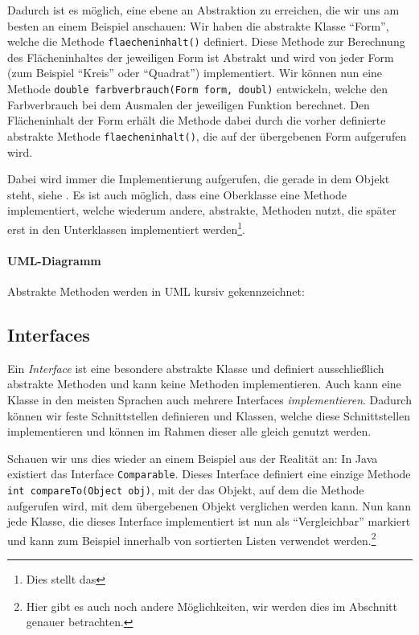 	Dadurch ist es möglich, eine ebene an Abstraktion zu erreichen, die wir uns am besten an einem Beispiel anschauen: Wir haben die abstrakte Klasse \enquote{Form}, welche die Methode \texttt{flaecheninhalt()} definiert. Diese Methode zur Berechnung des Flächeninhaltes der jeweiligen Form ist Abstrakt und wird von jeder Form (zum Beispiel \enquote{Kreis} oder \enquote{Quadrat}) implementiert. Wir können nun eine Methode \lstinline|double farbverbrauch(Form form, doubl)| entwickeln, welche den Farbverbrauch bei dem Ausmalen der jeweiligen Funktion berechnet. Den Flächeninhalt der Form erhält die Methode dabei durch die vorher definierte abstrakte Methode \texttt{flaecheninhalt()}, die auf der übergebenen Form aufgerufen wird.
	
	Dabei wird immer die Implementierung aufgerufen, die gerade in dem Objekt steht, siehe . Es ist auch möglich, dass eine Oberklasse eine Methode implementiert, welche wiederum andere, abstrakte, Methoden nutzt, die später erst in den Unterklassen implementiert werden\footnote{Dies stellt das }.
	
	\paragraph{UML-Diagramm}
		Abstrakte Methoden werden in UML kursiv gekennzeichnet:
		\begin{figure}[H]
			\centering
		\end{figure}

\subsection{Interfaces} \imperativeMark \oopMark
	Ein \textit{Interface} ist eine besondere abstrakte Klasse und definiert ausschließlich abstrakte Methoden und kann keine Methoden implementieren. Auch kann eine Klasse in den meisten Sprachen auch mehrere Interfaces \textit{implementieren}. Dadurch können wir feste Schnittstellen definieren und Klassen, welche diese Schnittstellen implementieren und können im Rahmen dieser alle gleich genutzt werden.
	
	Schauen wir uns dies wieder an einem Beispiel aus der Realität an: In Java existiert das Interface \lstinline|Comparable|. Dieses Interface definiert eine einzige Methode \lstinline|int compareTo(Object obj)|, mit der das Objekt, auf dem die Methode aufgerufen wird, mit dem übergebenen Objekt verglichen werden kann. Nun kann jede Klasse, die dieses Interface implementiert ist nun als \enquote{Vergleichbar} markiert und kann zum Beispiel innerhalb von sortierten Listen verwendet werden.\footnote{Hier gibt es auch noch andere Möglichkeiten, wir werden dies im Abschnitt  genauer betrachten.}
	
